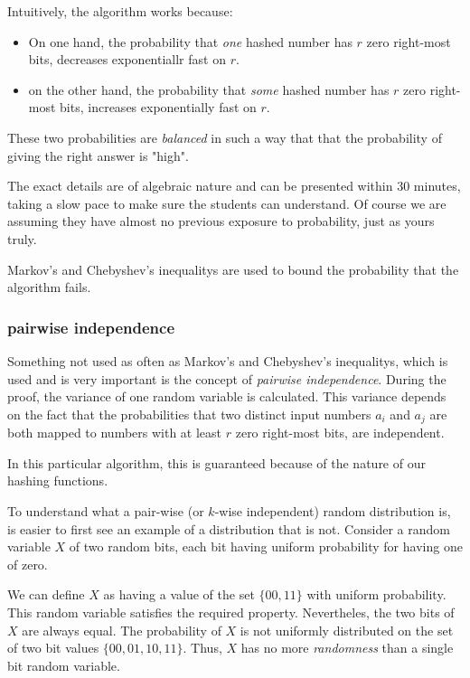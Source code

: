 \documentclass[12pt]{article}
\begin{document}
Intuitively, the algorithm works because:
\begin{itemize}
\item On one hand, the probability that \emph{one} hashed number has $r$ zero right-most  bits, decreases exponentiallr fast on $r$.
\item on the other hand, the probability that \emph{some} hashed number has $r$ zero right-most bits, increases exponentially fast on $r$.
\end{itemize}
These two probabilities are \emph{balanced} in such a way that that the probability of giving the right answer is "high".

The exact details are of algebraic nature and can be presented within 30 minutes, taking a slow pace to make sure the students can understand. Of course we are assuming they have almost no previous exposure to probability, just as yours truly.

Markov's and Chebyshev's inequalitys are used to bound the probability that the algorithm fails.

\subsubsection{pairwise independence}

Something not used as often as Markov's and Chebyshev's inequalitys, which is used and is very important 
is the concept of \emph{pairwise independence}. During the proof, the variance of one random variable is calculated. 
This variance depends on the fact that the probabilities that two distinct input numbers $a_i$ and $a_j$ are both mapped to numbers with at least $r$ zero right-most bits, are independent.

In this particular algorithm, this is guaranteed because of the nature of our hashing functions.

To understand what a pair-wise (or $k$-wise independent)  random distribution is, is easier to first see an example of a distribution that is not. 
Consider a  random variable $X$ of two random bits, each bit having uniform probability for having one of zero.

We can define $X$ as having a value of the set $\{00,11\}$ with uniform probability. This random variable satisfies the required property. Nevertheles, the two bits of $X$ are always equal. The probability of $X$ is not uniformly distributed on the set of two bit values $\{00,01,10,11\}$.
Thus, $X$ has no more \emph{randomness} than a single bit random variable.
\end{document}
